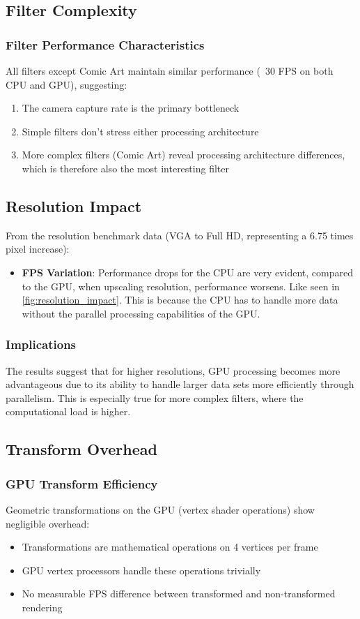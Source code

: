 \documentclass[12pt,a4paper]{article}
\begin{document}
\subsection{Filter Complexity}
\subsubsection{Filter Performance Characteristics}
All filters except Comic Art maintain similar performance (~30 FPS on both CPU and GPU), suggesting:
\begin{enumerate}
    \item The camera capture rate is the primary bottleneck
    \item Simple filters don't stress either processing architecture
    \item More complex filters (Comic Art) reveal processing architecture differences, which is therefore also the most interesting filter
\end{enumerate}

\subsection{Resolution Impact}
From the resolution benchmark data (VGA to Full HD, representing a 6.75 times pixel increase):
\begin{itemize}
    \item \textbf{FPS Variation}: Performance drops for the CPU are very evident, compared to the GPU, when upscaling resolution, performance worsens. Like seen in \ref{fig:resolution_impact}. This is because the CPU has to handle more data without the parallel processing capabilities of the GPU.
\end{itemize}

\subsubsection{Implications}
The results suggest that for higher resolutions, GPU processing becomes more advantageous due to its ability to handle larger data sets more efficiently through parallelism. This is especially true for more complex filters, where the computational load is higher. 

\subsection{Transform Overhead}
\subsubsection{GPU Transform Efficiency}
Geometric transformations on the GPU (vertex shader operations) show negligible overhead:
\begin{itemize}
    \item Transformations are mathematical operations on 4 vertices per frame
    \item GPU vertex processors handle these operations trivially
    \item No measurable FPS difference between transformed and non-transformed rendering
\end{itemize}
\end{document}
